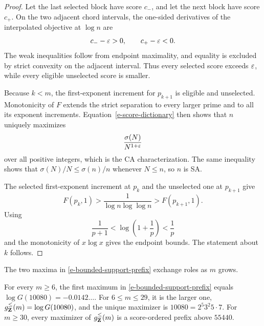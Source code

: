 \begin{proof}
Let the last selected block have score \(c_-\), and let the next block
have score \(c_+\). On the two adjacent chord intervals, the one-sided
derivatives of the interpolated objective at \(\log n\) are
\[
    c_- -\varepsilon>0,
    \qquad
    c_+ -\varepsilon<0.
\]
The weak inequalities follow from endpoint maximality, and equality is
excluded by strict convexity on the adjacent interval. Thus every
selected score exceeds \(\varepsilon\), while every eligible unselected score is
smaller.

Because \(k<m\), the first-exponent increment for \(p_{k+1}\) is eligible
and unselected.
Monotonicity of \(F\) extends the strict separation to every larger prime
and to all its exponent increments. Equation~\eqref{e-score-dictionary}
then shows that \(n\) uniquely maximizes
\[
    \frac{\sigma(N)}{N^{1+\varepsilon}}
\]
over all positive integers, which is the CA characterization. The same
inequality shows that \(\sigma(N)/N\leq\sigma(n)/n\) whenever \(N\leq n\),
so \(n\) is SA.

The selected first-exponent increment at \(p_k\) and the unselected one
at \(p_{k+1}\) give
\[
    F(p_k,1)>\frac1{\log n\log\log n}>F(p_{k+1},1).
\]
Using
\[
    \frac1{p+1}
    <
    \log\left(1+\frac1p\right)
    <
    \frac1p
\]
and the monotonicity of \(x\log x\) gives the endpoint bounds. The
statement about \(k\) follows.
\end{proof}

The two maxima in \eqref{e-bounded-support-prefix} exchange roles as
\(m\) grows.

\begin{proposition}
\label{prop-eventual-prefix}
For every \(m\geq6\), the first maximum in
\eqref{e-bounded-support-prefix} equals
\(\log G(10080)=-0.0142\ldots\). For \(6\leq m\leq29\), it is the
larger one, \(g_{\mathbf{Z}}^{\leq}(m)=\log G(10080)\), and the unique
maximizer is \(10080=2^{5}3^{2}5\cdot7\). For \(m\geq30\), every
maximizer of \(g_{\mathbf{Z}}^{\leq}(m)\) is a score-ordered prefix
above \(55440\).
\end{proposition}

